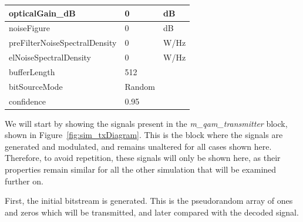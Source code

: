 \begin{longtable}[h]{|l|l|l|}
		opticalGain\_dB               & 0                    & dB \\\hline
		noiseFigure                   & 0                    & dB \\\hline
		preFilterNoiseSpectralDensity & 0                    & W/Hz\\\hline
		elNoiseSpectralDensity        & 0                    & W/Hz\\\hline
		bufferLength                  & 512                  & \\\hline
		bitSourceMode                 & Random               & \\\hline
		confidence                    & 0.95                 & \\\hline
	\end{longtable}


	We will start by showing the signals present in the 
	\textit{m\_qam\_transmitter} block, shown
	in Figure~\ref{fig:sim_txDiagram}. This is the block where the signals are 
	generated and modulated, and remains unaltered for all cases shown here. 
	Therefore, to avoid repetition, these signals will only be shown here, as 
	their properties remain similar for all the other simulation that will be 
	examined further on.

	First, the initial bitstream is generated. This is the pseudorandom array of 
	ones and zeros which will be transmitted, and later compared with the decoded 
	signal.
	
